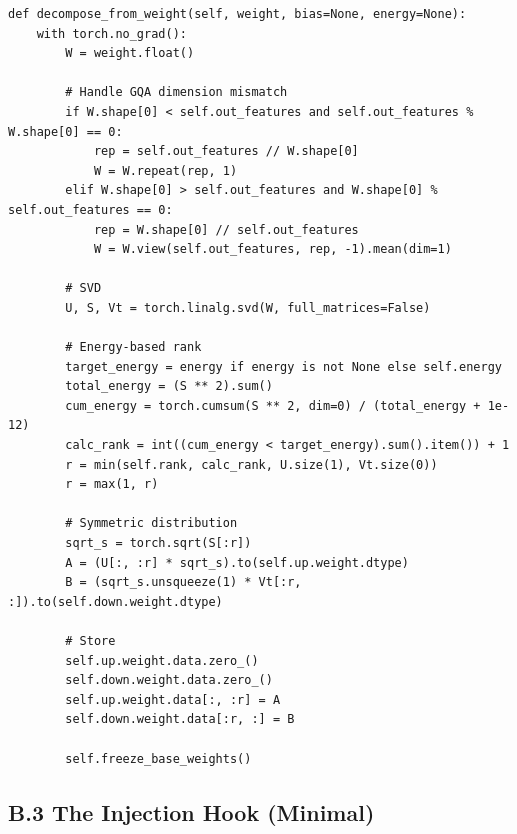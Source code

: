 \begin{lstlisting}
def decompose_from_weight(self, weight, bias=None, energy=None):
    with torch.no_grad():
        W = weight.float()
        
        # Handle GQA dimension mismatch
        if W.shape[0] < self.out_features and self.out_features % W.shape[0] == 0:
            rep = self.out_features // W.shape[0]
            W = W.repeat(rep, 1)
        elif W.shape[0] > self.out_features and W.shape[0] % self.out_features == 0:
            rep = W.shape[0] // self.out_features
            W = W.view(self.out_features, rep, -1).mean(dim=1)
        
        # SVD
        U, S, Vt = torch.linalg.svd(W, full_matrices=False)
        
        # Energy-based rank
        target_energy = energy if energy is not None else self.energy
        total_energy = (S ** 2).sum()
        cum_energy = torch.cumsum(S ** 2, dim=0) / (total_energy + 1e-12)
        calc_rank = int((cum_energy < target_energy).sum().item()) + 1
        r = min(self.rank, calc_rank, U.size(1), Vt.size(0))
        r = max(1, r)
        
        # Symmetric distribution
        sqrt_s = torch.sqrt(S[:r])
        A = (U[:, :r] * sqrt_s).to(self.up.weight.dtype)
        B = (sqrt_s.unsqueeze(1) * Vt[:r, :]).to(self.down.weight.dtype)
        
        # Store
        self.up.weight.data.zero_()
        self.down.weight.data.zero_()
        self.up.weight.data[:, :r] = A
        self.down.weight.data[:r, :] = B
        
        self.freeze_base_weights()
\end{lstlisting}

\subsection{B.3 The Injection Hook (Minimal)}

